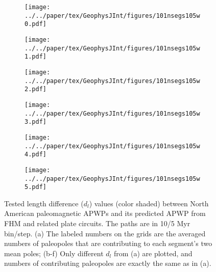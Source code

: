 \begin{figure}[!ht]
  \captionsetup[subfigure]{singlelinecheck=off,justification=raggedright,aboveskip=-6pt,belowskip=-6pt}
  \centering
  \begin{subfigure}{.495\textwidth}
    \texttt{[image: ../../paper/tex/GeophysJInt/figures/101nsegs105w0.pdf]}
    \caption{}\label{fig-na-dlw0}
  \end{subfigure}
  \vspace{.1em}
  \begin{subfigure}{.495\textwidth}
    \texttt{[image: ../../paper/tex/GeophysJInt/figures/101nsegs105w1.pdf]}
    \caption{}\label{fig-na-dlw1}
  \end{subfigure}
  \vspace{.1em}
  \begin{subfigure}{.495\textwidth}
    \texttt{[image: ../../paper/tex/GeophysJInt/figures/101nsegs105w2.pdf]}
    \caption{}\label{fig-na-dlw2}
  \end{subfigure}
  \vspace{.1em}
  \begin{subfigure}{.495\textwidth}
    \texttt{[image: ../../paper/tex/GeophysJInt/figures/101nsegs105w3.pdf]}
    \caption{}\label{fig-na-dlw3}
  \end{subfigure}
  \vspace{.1em}
  \begin{subfigure}{.495\textwidth}
    \texttt{[image: ../../paper/tex/GeophysJInt/figures/101nsegs105w4.pdf]}
    \caption{}\label{fig-na-dlw4}
  \end{subfigure}
  \vspace{.1em}
  \begin{subfigure}{.495\textwidth}
    \texttt{[image: ../../paper/tex/GeophysJInt/figures/101nsegs105w5.pdf]}
    \caption{}\label{fig-na-dlw5}
  \end{subfigure}
  \caption[$d_l$ of each pair of segments for North American 10/5 Myr
    APWPs]{Tested length difference ($d_l$) values (color shaded) between North
    American paleomagnetic APWPs and its predicted APWP from FHM and related
    plate circuits. The paths are in 10/5 Myr bin/step. (a) The labeled numbers
    on the grids are the averaged numbers of paleopoles that are contributing to
    each segment's two mean poles; (b-f) Only different $d_l$ from (a) are
    plotted, and numbers of contributing paleopoles are exactly the same as in
    (a).}\label{fig-nadl}
\end{figure}
